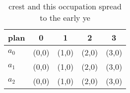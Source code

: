 \documentclass[a4paper]{article}
\begin{document}
\begin{table}
\begin{adjustbox}{width=0.6\columnwidth}
\begin{tabular}{|l|l|l|l|l|}
\hline
\textbf{plan} & \multicolumn{1}{c|}{\textbf{0}} & \multicolumn{1}{c|}{\textbf{1}} & \multicolumn{1}{c|}{\textbf{2}} & \multicolumn{1}{c|}{\textbf{3}} \\ \hline
\textbf{$a_0$}  & (0,0) & (1,0) & (2,0) & (3,0) \\ \hline
\textbf{$a_1$}  & (0,0) & (1,0) & (2,0) & (3,0) \\ \hline
\textbf{$a_2$}  & (0,0) & (1,0) & (2,0) & (3,0) \\ \hline
\end{tabular}
\end{adjustbox}
\caption{ crest and this occupation spread to the early ye
}
\end{table}
\end{document}
